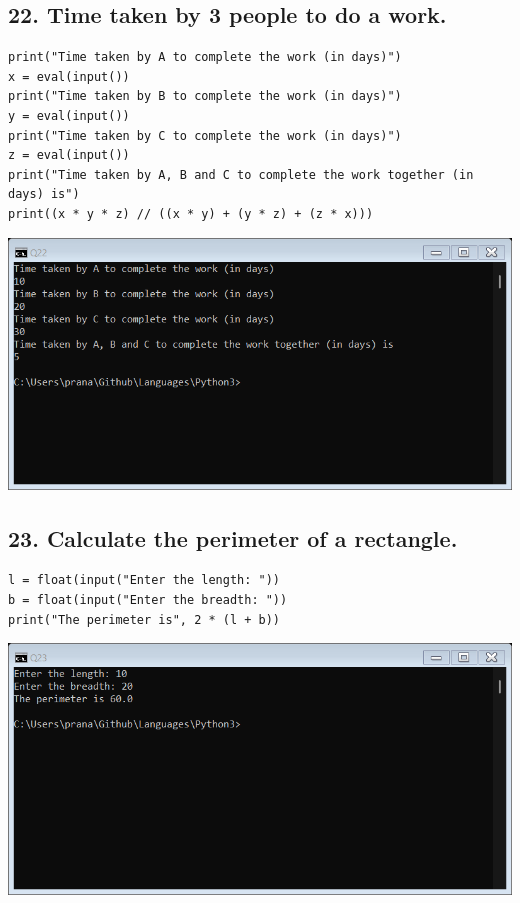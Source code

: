 \documentclass[12pt]{article}
\begin{document}
\subsection*{22. Time taken by 3 people to do a work.}
\begin{verbatim}
print("Time taken by A to complete the work (in days)")
x = eval(input())
print("Time taken by B to complete the work (in days)")
y = eval(input())
print("Time taken by C to complete the work (in days)")
z = eval(input())
print("Time taken by A, B and C to complete the work together (in days) is")
print((x * y * z) // ((x * y) + (y * z) + (z * x)))
\end{verbatim}
\includegraphics[width=\linewidth]{images/22.png}

\subsection*{23. Calculate the perimeter of a rectangle.}
\begin{verbatim}
l = float(input("Enter the length: "))
b = float(input("Enter the breadth: "))
print("The perimeter is", 2 * (l + b))
\end{verbatim}
\includegraphics[width=\linewidth]{images/23.png}
\end{document}
